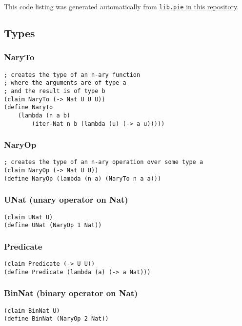 This code listing was generated automatically from \href{https://github.com/thechosenreader/The-Little-Typer-Notes}{\lstinline{lib.pie} in this repository}.
\subsection{Types}

\subsubsection{NaryTo} \label{code:NaryTo}
\begin{lstlisting}
; creates the type of an n-ary function
; where the arguments are of type a
; and the result is of type b
(claim NaryTo (-> Nat U U U))
(define NaryTo
    (lambda (n a b)
        (iter-Nat n b (lambda (u) (-> a u)))))
\end{lstlisting}

\subsubsection{NaryOp} \label{code:NaryOp}
\begin{lstlisting}
; creates the type of an n-ary operation over some type a
(claim NaryOp (-> Nat U U))
(define NaryOp (lambda (n a) (NaryTo n a a)))
\end{lstlisting}

\subsubsection{UNat (unary operator on Nat)} \label{code:UNat}
\begin{lstlisting}
(claim UNat U)
(define UNat (NaryOp 1 Nat))
\end{lstlisting}

\subsubsection{Predicate} \label{code:Predicate}
\begin{lstlisting}
(claim Predicate (-> U U))
(define Predicate (lambda (a) (-> a Nat)))
\end{lstlisting}

\subsubsection{BinNat (binary operator on Nat)} \label{code:BinNat}
\begin{lstlisting}
(claim BinNat U)
(define BinNat (NaryOp 2 Nat))
\end{lstlisting}



